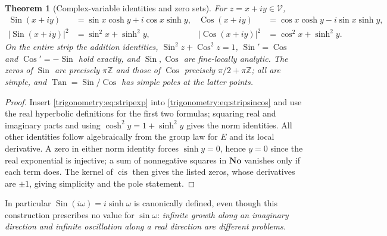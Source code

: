 \documentclass[11pt,letterpaper]{article}
\numberwithin{equation}{section}
\newtheorem{theorem}{Theorem}[section]
\theoremstyle{definition}
\theoremstyle{remark}
\newcommand{\No}{\mathbf{No}}
\newcommand{\Z}{\mathbb Z}
\newcommand{\cis}{\operatorname{cis}}
\newcommand{\Sin}{\operatorname{Sin}}
\newcommand{\Cos}{\operatorname{Cos}}
\newcommand{\Tan}{\operatorname{Tan}}
\begin{document}
\begin{theorem}[Complex-variable identities and zero sets]\label{trigonometry:thm:striptrig}
For $z=x+iy\in\mathscr V$,
\begin{align}
 \Sin(x+iy)&=\sin x\cosh y+i\cos x\sinh y,&
 \Cos(x+iy)&=\cos x\cosh y-i\sin x\sinh y,\\
 |\Sin(x+iy)|^2&=\sin^2x+\sinh^2y,&
 |\Cos(x+iy)|^2&=\cos^2x+\sinh^2y.
 \label{trigonometry:eq:stripmoduli}
\end{align}
On the entire strip the addition identities, $\Sin^2z+\Cos^2z=1$, $\Sin'=\Cos$ and $\Cos'=-\Sin$
hold exactly, and $\Sin,\Cos$ are fine-locally analytic. The zeros of $\Sin$ are precisely $\pi\Z$
and those of $\Cos$ precisely $\pi/2+\pi\Z$; all are simple, and $\Tan=\Sin/\Cos$ has simple poles
at the latter points.
\end{theorem}
\begin{proof}
Insert \cref{trigonometry:eq:stripexp} into \cref{trigonometry:eq:stripsincos} and use the real
hyperbolic definitions for the first two formulas; squaring real and imaginary parts and using
$\cosh^2y=1+\sinh^2y$ gives the norm identities. All other identities follow algebraically from
the group law for $E$ and its local derivative. A zero in either norm identity forces
$\sinh y=0$, hence $y=0$ since the real exponential is injective; a sum of nonnegative squares in
$\No$ vanishes only if each term does. The kernel of $\cis$ then gives the listed zeros, whose
derivatives are $\pm1$, giving simplicity and the pole statement.
\end{proof}
In particular $\Sin(i\omega)=i\sinh\omega$ is canonically defined, even though this construction
prescribes no value for $\sin\omega$: \emph{infinite growth along an imaginary direction and
infinite oscillation along a real direction are different problems.}
\end{document}
